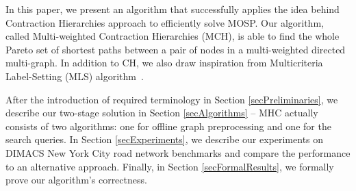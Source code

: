 
In this paper, we present an algorithm that successfully applies the idea behind Contraction Hierarchies approach to efficiently solve MOSP. Our algorithm, called Multi-weighted Contraction Hierarchies (MCH), is able to find the whole Pareto set of shortest paths between a pair of nodes in a multi-weighted directed multi-graph. In addition to CH, we also draw inspiration from Multicriteria Label-Setting (MLS) algorithm~\cite{martins1984multicriteria}. 








After the introduction of required terminology in Section \ref{secPreliminaries}, we describe our two-stage solution in Section \ref{secAlgorithms} -- MHC actually consists of two algorithms: one for offline graph preprocessing and one for the search queries. In Section \ref{secExperiments}, we describe our experiments on DIMACS New York City road network benchmarks and compare the performance to an alternative approach. Finally, in Section \ref{secFormalResults}, we formally prove our algorithm's correctness.



